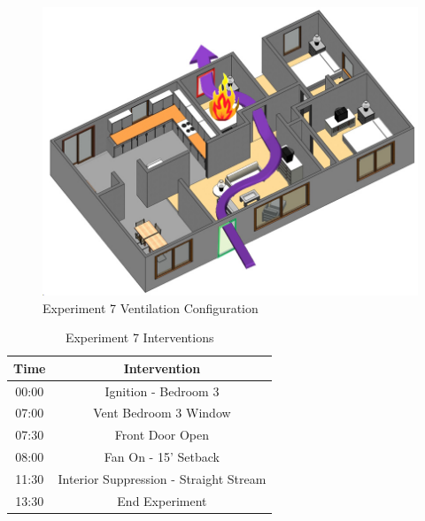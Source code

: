 \documentclass{article}
\begin{document}
\begin{figure}[H]
	\centering
	\includegraphics[width=5in]{0_Images/FireExperiments/Single_Story/Experiment_7.jpg}
	\caption{Experiment 7 Ventilation Configuration}
	\label{fig:Exp7VentConfig}
\end{figure}

\begin{table}[H]
	\centering
	\caption{Experiment 7 Interventions}
	\begin{tabular}{|c|c|} 
		\hline
		Time & Intervention \\ \hline \hline
		00:00 & Ignition - Bedroom 3 \\ \hline
		07:00 & Vent Bedroom 3 Window \\ \hline
		07:30 & Front Door Open \\ \hline
		08:00 & Fan On - 15' Setback \\ \hline
		11:30 & Interior Suppression - Straight Stream\\ \hline
		13:30 & End Experiment\\ \hline
	\end{tabular}
	\label{Table:Exp7Interventions}
\end{table}

\clearpage
\end{document}
